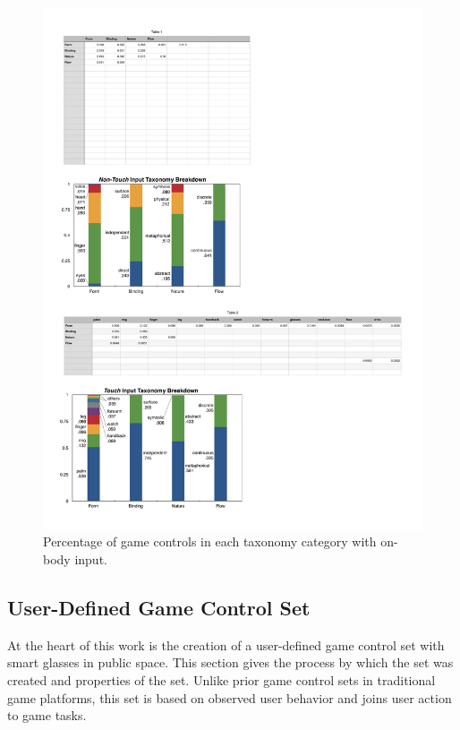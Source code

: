 \documentclass{sigchi}
\begin{document}
 \begin{figure}[!h]
  \centering
  \includegraphics[width=1.02\columnwidth]{OnbodyTaxonomy}
  \caption{Percentage of game controls in each taxonomy category with on-body input.}
  \label{fig:OnbodyTaxonomy}
  \end{figure} 

  \subsection{User-Defined Game Control Set}
  At the heart of this work is the creation of a user-defined game control set with smart glasses in public space. This section gives the process by which the set was created and properties of the set. Unlike prior game control sets in traditional game platforms, this set is based on observed user behavior and joins user action to game tasks.
\end{document}

